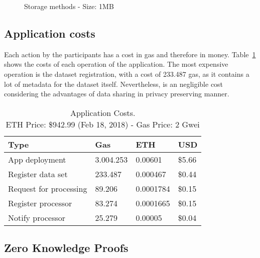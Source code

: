 \begin{figure}[!ht]
  \centering
  \caption{Storage methods - Size: 1MB}
  \label{fig:storage:charts:1mb}
\end{figure}

\subsection{Application costs}
\label{evaluation:app_costs}

Each action by the participants has a cost in gas and therefore in money. Table~\ref{table:app_costs} shows the costs of each operation of the application. The most expensive operation is the dataset registration, with a cost of 233.487 gas, as it contains a lot of metadata for the dataset itself. Nevertheless, is an negligible cost considering the advantages of data sharing in privacy preserving manner.

\begin{table}[!htb]
\centering
\captionsetup{format=hang, justification=centering}
\caption[Application Costs]{Application Costs.\\ ETH Price: \$942.99 (Feb 18, 2018) - Gas Price: 2 Gwei}
\begin{tabular}{|l|l|l|l|}
\hline
 Type & Gas & ETH & USD \\ \hline
 App deployment & 3.004.253 & 0.00601 & \$5.66 \\ \hline
 Register data set & 233.487 & 0.000467 & \$0.44 \\ \hline
 Request for processing & 89.206 & 0.0001784 & \$0.15 \\ \hline
 Register processor & 83.274 & 0.0001665 & \$0.15 \\ \hline
 Notify processor & 25.279 & 0.00005 & \$0.04 \\ \hline
\end{tabular}
\label{table:app_costs}
\end{table}

\subsection{Zero Knowledge Proofs}
\label{evaluation:zkp}

